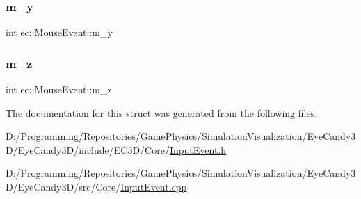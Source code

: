 \mbox{\label{structec_1_1_mouse_event_a70f1a81a4a1099cb425a4461d23dfbba}} 
\subsubsection{\texorpdfstring{m\+\_\+y}{m\_y}}
{\footnotesize\ttfamily int ec\+::\+Mouse\+Event\+::m\+\_\+y}

\mbox{\label{structec_1_1_mouse_event_a6ba4ec5d26b3dbe8be4d57b4197bada2}} 
\subsubsection{\texorpdfstring{m\+\_\+z}{m\_z}}
{\footnotesize\ttfamily int ec\+::\+Mouse\+Event\+::m\+\_\+z}



The documentation for this struct was generated from the following files\+:\begin{DoxyCompactItemize}
\item 
D\+:/\+Programming/\+Repositories/\+Game\+Physics/\+Simulation\+Visualization/\+Eye\+Candy3\+D/\+Eye\+Candy3\+D/include/\+E\+C3\+D/\+Core/\mbox{\hyperlink{_input_event_8h}{Input\+Event.\+h}}\item 
D\+:/\+Programming/\+Repositories/\+Game\+Physics/\+Simulation\+Visualization/\+Eye\+Candy3\+D/\+Eye\+Candy3\+D/src/\+Core/\mbox{\hyperlink{_input_event_8cpp}{Input\+Event.\+cpp}}\end{DoxyCompactItemize}
